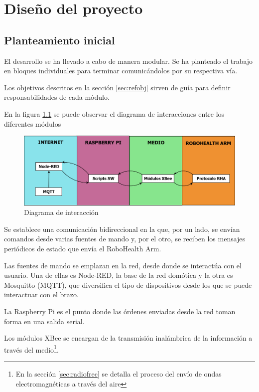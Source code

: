 
\chapter{Diseño del proyecto}

\section{Planteamiento inicial}

El desarrollo se ha llevado a cabo de manera modular. Se ha planteado el trabajo en bloques individuales para terminar comunicándolos por su respectiva vía.

Los objetivos descritos en la sección \ref{sec:refobj} sirven de guía para definir responsabilidades de cada módulo.

En la figura \ref{fig:diainteraccion} se puede observar el diagrama de interacciones entre los diferentes módulos

\begin{figure}[tb]
\centering
\includegraphics[width=1\textwidth]{figuras/DiaInteraccion.png}
\caption{Diagrama de interacción}
\label{fig:diainteraccion}
\end{figure}

Se establece una comunicación bidireccional en la que, por un lado, se envían comandos desde varias fuentes de mando y, por el otro, se reciben los mensajes periódicos de estado que envía el RoboHealth Arm.

Las fuentes de mando se emplazan en la red, desde donde se interactúa con el usuario. Una de ellas es Node-RED, la base de la red domótica y la otra es Mosquitto (MQTT), que diversifica el tipo de dispositivos desde los que se puede interactuar con el brazo.

La Raspberry Pi es el punto donde las órdenes enviadas desde la red toman forma en una salida serial.

Los módulos XBee se encargan de la transmisión inalámbrica de la información a través del medio\footnote{En la sección \ref{sec:radiofrec} se detalla el proceso del envío de ondas electromagnéticas a través del aire}.

